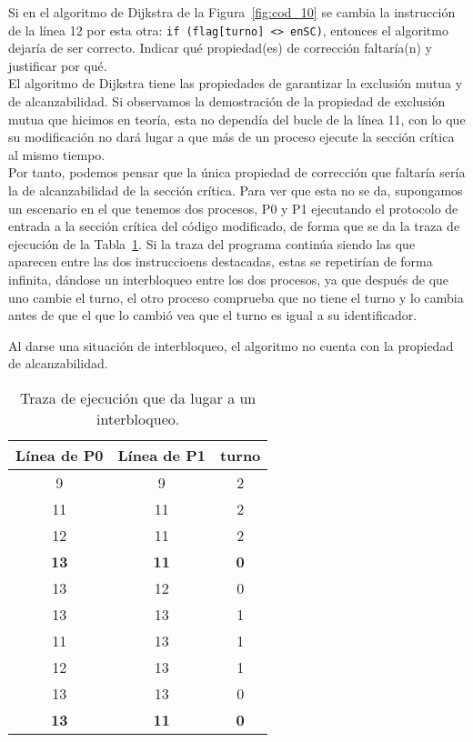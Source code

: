 \newpage
\begin{ejercicio}
    Si en el algoritmo de Dijkstra de la Figura~\ref{fig:cod_10} se cambia la instrucción de la línea 12 por esta otra: \verb|if (flag[turno] <> enSC)|, entonces el algoritmo dejaría de ser correcto. Indicar qué propiedad(es) de corrección faltaría(n) y justificar por qué.\\

    El algoritmo de Dijkstra tiene las propiedades de garantizar la exclusión mutua y de alcanzabilidad. Si observamos la demostración de la propiedad de exclusión mutua que hicimos en teoría, esta no dependía del bucle de la línea 11, con lo que su modificación no dará lugar a que más de un proceso ejecute la sección crítica al mismo tiempo.\\

    Por tanto, podemos pensar que la única propiedad de corrección que faltaría sería la de alcanzabilidad de la sección crítica. Para ver que esta no se da, supongamos un escenario en el que tenemos dos procesos, P0 y P1 ejecutando el protocolo de entrada a la sección crítica del código modificado, de forma que se da la traza de ejecución de la Tabla~\ref{tab:ej_12}. Si la traza del programa continúa siendo las que aparecen entre las dos instruccioens destacadas, estas se repetirían de forma infinita, dándose un interbloqueo entre los dos procesos, ya que después de que uno cambie el turno, el otro proceso comprueba que no tiene el turno y lo cambia antes de que el que lo cambió vea que el turno es igual a su identificador. 

    Al darse una situación de interbloqueo, el algoritmo no cuenta con la propiedad de alcanzabilidad.
    \begin{table}[H]
    \centering
    \begin{tabular}{|c|c|c|}
        \hline
        Línea de P0 & Línea de P1 & turno \\
        \hline
        9 & 9 & 2 \\
        \hline
        11 & 11 & 2 \\
        \hline
        12 & 11 & 2 \\
        \hline
        \textbf{13} & \textbf{11} & \textbf{0} \\
        \hline
        13 & 12 & 0 \\
        \hline
        13 & 13 & 1 \\
        \hline
        11 & 13 & 1 \\
        \hline
        12 & 13 & 1 \\
        \hline
        13 & 13 & 0 \\
        \hline
        \textbf{13} & \textbf{11} & \textbf{0} \\
        \hline
    \end{tabular}
    \caption{Traza de ejecución que da lugar a un interbloqueo.}
    \label{tab:ej_12}
    \end{table}
\end{ejercicio}

